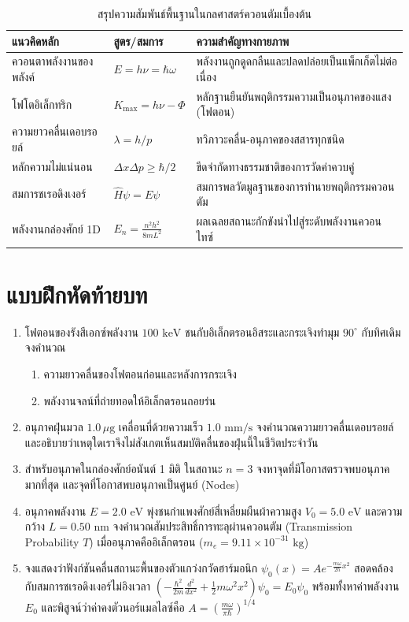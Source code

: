 \begin{table}[H]
\centering
\caption{สรุปความสัมพันธ์พื้นฐานในกลศาสตร์ควอนตัมเบื้องต้น}
\label{tab:quantum_summary}
\small
\begin{tabularx}{\textwidth}{l >{\centering\arraybackslash}p{4.2cm} Y}
\toprule
\textbf{แนวคิดหลัก} & \textbf{สูตร/สมการ} & \textbf{ความสำคัญทางกายภาพ} \\
\midrule
ควอนตาพลังงานของพลังค์ & $E = h\nu = \hbar\omega$ & พลังงานถูกดูดกลืนและปลดปล่อยเป็นแพ็กเก็ตไม่ต่อเนื่อง \\
โฟโตอิเล็กทริก & $K_{\max} = h\nu - \Phi$ & หลักฐานยืนยันพฤติกรรมความเป็นอนุภาคของแสง (โฟตอน) \\
ความยาวคลื่นเดอบรอยล์ & $\lambda = h/p$ & ทวิภาวะคลื่น-อนุภาคของสสารทุกชนิด \\
หลักความไม่แน่นอน & $\Delta x \Delta p \ge \hbar/2$ & ขีดจำกัดทางธรรมชาติของการวัดค่าควบคู่ \\
สมการชเรอดิงเงอร์ & $\hat{H}\psi = E\psi$ & สมการพลวัตมูลฐานของการทำนายพฤติกรรมควอนตัม \\
พลังงานกล่องศักย์ 1D & $E_n = \frac{n^2 h^2}{8mL^2}$ & ผลเฉลยสถานะกักขังนำไปสู่ระดับพลังงานควอนไทซ์ \\
\bottomrule
\end{tabularx}
\end{table}

\section{แบบฝึกหัดท้ายบท}
\begin{enumerate}
    \item โฟตอนของรังสีเอกซ์พลังงาน $100\text{ keV}$ ชนกับอิเล็กตรอนอิสระและกระเจิงทำมุม $90^\circ$ กับทิศเดิม จงคำนวณ
    \begin{enumerate}
        \item ความยาวคลื่นของโฟตอนก่อนและหลังการกระเจิง
        \item พลังงานจลน์ที่ถ่ายทอดให้อิเล็กตรอนถอยร่น
    \end{enumerate}
    \item อนุภาคฝุ่นมวล $1.0\,\mu\text{g}$ เคลื่อนที่ด้วยความเร็ว $1.0\text{ mm/s}$ จงคำนวณความยาวคลื่นเดอบรอยล์ และอธิบายว่าเหตุใดเราจึงไม่สังเกตเห็นสมบัติคลื่นของฝุ่นนี้ในชีวิตประจำวัน
    \item สำหรับอนุภาคในกล่องศักย์อนันต์ 1 มิติ ในสถานะ $n=3$ จงหาจุดที่มีโอกาสตรวจพบอนุภาคมากที่สุด และจุดที่โอกาสพบอนุภาคเป็นศูนย์ (Nodes)
    \item อนุภาคพลังงาน $E = 2.0\text{ eV}$ พุ่งชนกำแพงศักย์สี่เหลี่ยมผืนผ้าความสูง $V_0 = 5.0\text{ eV}$ และความกว้าง $L = 0.50\text{ nm}$ จงคำนวณสัมประสิทธิ์การทะลุผ่านควอนตัม (Transmission Probability $T$) เมื่ออนุภาคคืออิเล็กตรอน ($m_e = 9.11 \times 10^{-31}\text{ kg}$)
    \item จงแสดงว่าฟังก์ชันคลื่นสถานะพื้นของตัวแกว่งกวัดฮาร์มอนิก $\psi_0(x) = A e^{-\frac{m\omega}{2\hbar}x^2}$ สอดคล้องกับสมการชเรอดิงเงอร์ไม่อิงเวลา $\left(-\frac{\hbar^2}{2m}\frac{d^2}{dx^2} + \frac{1}{2}m\omega^2 x^2\right)\psi_0 = E_0 \psi_0$ พร้อมทั้งหาค่าพลังงาน $E_0$ และพิสูจน์ว่าค่าคงตัวนอร์แมลไลซ์คือ $A = \left(\frac{m\omega}{\pi\hbar}\right)^{1/4}$
\end{enumerate}

